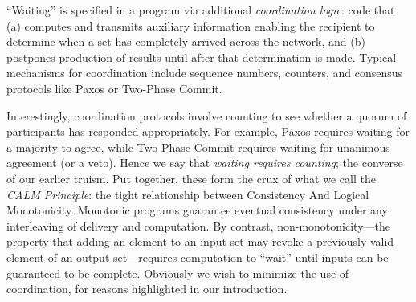 ``Waiting'' is specified in a program via additional \emph{coordination logic}: code that (a) computes and transmits auxiliary information enabling the recipient to determine when a set has completely arrived across the network, and (b) postpones production of results until after that determination is made.  Typical mechanisms for coordination include sequence numbers, counters, and consensus protocols like Paxos or Two-Phase Commit.

Interestingly, coordination protocols involve counting to see whether a quorum of participants has responded appropriately.  For example, Paxos requires waiting for a majority to agree, while Two-Phase Commit requires waiting for unanimous agreement (or a veto).  Hence we say that {\em waiting requires counting}; the converse of our earlier truism.  Put together, these form the crux of what we call the {\em CALM Principle}: the tight relationship between Consistency And Logical Monotonicity.  Monotonic programs guarantee eventual consistency under any interleaving of delivery and computation.  By contrast, non-monotonicity---the property that adding an element to an input set may revoke a previously-valid element of an output set---requires computation to ``wait'' until inputs can be guaranteed to be complete.  Obviously we wish to minimize the use of coordination, for reasons highlighted in our introduction.

